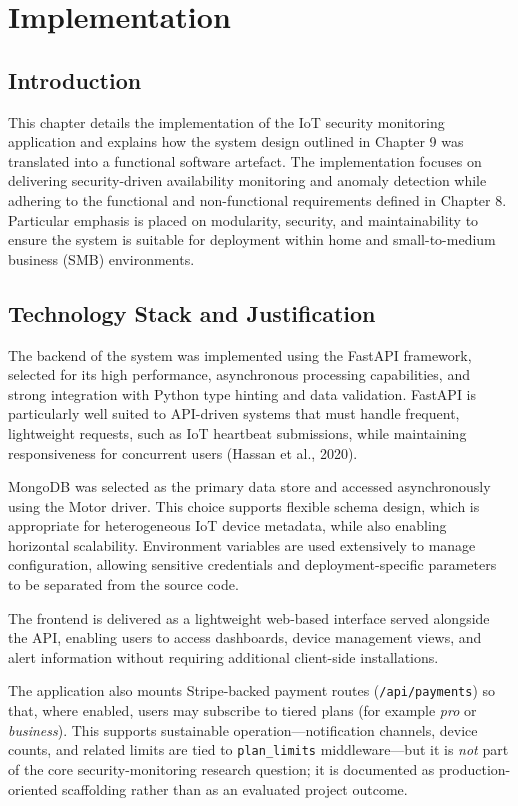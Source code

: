 \chapter{Implementation}
\label{ch:impl}

\section{Introduction}

This chapter details the implementation of the IoT security monitoring application and explains how the system design outlined in Chapter 9 was translated into a functional software artefact. The implementation focuses on delivering security-driven availability monitoring and anomaly detection while adhering to the functional and non-functional requirements defined in Chapter 8. Particular emphasis is placed on modularity, security, and maintainability to ensure the system is suitable for deployment within home and small-to-medium business (SMB) environments.

\section{Technology Stack and Justification}

The backend of the system was implemented using the FastAPI framework, selected for its high performance, asynchronous processing capabilities, and strong integration with Python type hinting and data validation. FastAPI is particularly well suited to API-driven systems that must handle frequent, lightweight requests, such as IoT heartbeat submissions, while maintaining responsiveness for concurrent users (Hassan et al., 2020).

MongoDB was selected as the primary data store and accessed asynchronously using the Motor driver. This choice supports flexible schema design, which is appropriate for heterogeneous IoT device metadata, while also enabling horizontal scalability. Environment variables are used extensively to manage configuration, allowing sensitive credentials and deployment-specific parameters to be separated from the source code.

The frontend is delivered as a lightweight web-based interface served alongside the API, enabling users to access dashboards, device management views, and alert information without requiring additional client-side installations.

The application also mounts Stripe-backed payment routes (\texttt{/api/payments}) so that, where enabled, users may subscribe to tiered plans (for example \emph{pro} or \emph{business}). This supports sustainable operation---notification channels, device counts, and related limits are tied to \texttt{plan\_limits} middleware---but it is \emph{not} part of the core security-monitoring research question; it is documented as production-oriented scaffolding rather than as an evaluated project outcome.

